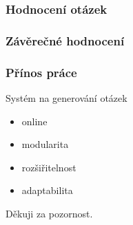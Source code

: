 \documentclass[xcolor=svgnames]{beamer}
\begin{document}
\begin{frame}
\frametitle{Hodnocení otázek}
\begin{center}


\end{center}
\end{frame}
\begin{frame}
\frametitle{Závěrečné hodnocení}
\begin{center}


\end{center}
\end{frame}
\begin{frame}
\frametitle{Přínos práce}
Systém na generování otázek
\begin{itemize}
\item online
\item modularita
\item rozšiřitelnost
\item adaptabilita
\end{itemize}
\end{frame}
\begin{frame}[plain]
\begin{center}
Děkuji za pozornost.
\end{center}
\end{frame}
\end{document}
